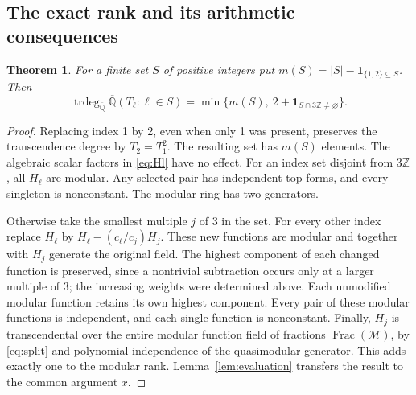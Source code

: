 \documentclass[11pt,a4paper]{article}
\newtheorem{theorem}{Theorem}[section]
\theoremstyle{definition}
\theoremstyle{remark}
\newcommand{\Z}{\mathbb Z}
\newcommand{\K}{\overline{\mathbb Q}}
\DeclareMathOperator{\trdeg}{trdeg}
\numberwithin{equation}{section}
\begin{document}
\subsection{The exact rank and its arithmetic consequences}
\begin{theorem}\label{thm:chang-rank}
For a finite set $S$ of positive integers put $m(S)=|S|-\mathbf1_{\{1,2\}\subseteq S}$. Then
\[
 \trdeg_{\K}\K(T_\ell:\ell\in S)
 =\min\{m(S),\ 2+\mathbf1_{S\cap3\Z\ne\varnothing}\}.
\]
\end{theorem}
\begin{proof}
Replacing index 1 by 2, even when only 1 was present, preserves the transcendence degree by $T_2=T_1^2$. The resulting set has $m(S)$ elements. The algebraic scalar factors in \eqref{eq:Hl} have no effect. For an index set disjoint from $3\Z$, all $H_\ell$ are modular. Any selected pair has independent top forms, and every singleton is nonconstant. The modular ring has two generators.

Otherwise take the smallest multiple $j$ of 3 in the set. For every other index replace $H_\ell$ by $H_\ell-(c_\ell/c_j)H_j$. These new functions are modular and together with $H_j$ generate the original field. The highest component of each changed function is preserved, since a nontrivial subtraction occurs only at a larger multiple of 3; the increasing weights were determined above. Each unmodified modular function retains its own highest component. Every pair of these modular functions is independent, and each single function is nonconstant. Finally, $H_j$ is transcendental over the entire modular function field of fractions $\operatorname{Frac}(\mathcal M)$, by \eqref{eq:split} and polynomial independence of the quasimodular generator. This adds exactly one to the modular rank. Lemma~\ref{lem:evaluation} transfers the result to the common argument $x$.
\end{proof}
\end{document}
